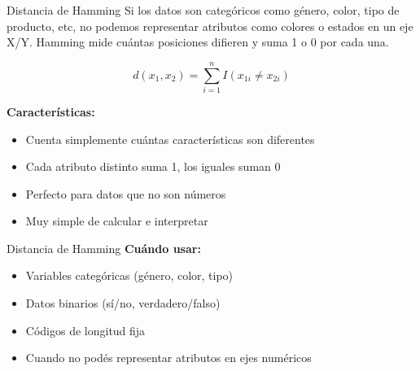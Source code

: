 \documentclass{beamer}
\begin{document}
\begin{frame}{Distancia de Hamming}
    Si los datos son categóricos como género, color, tipo de producto, etc, no podemos representar atributos como colores o estados en un eje X/Y. Hamming mide cuántas posiciones difieren y suma 1 o 0 por cada una.
    
    \[d(x_1, x_2) = \sum_{i=1}^{n} I(x_{1i} \neq x_{2i})\]
    
    \vspace{0.3cm}
    
    \textbf{Características:}
    \begin{itemize}
        \item Cuenta simplemente cuántas características son diferentes
        \item Cada atributo distinto suma 1, los iguales suman 0
        \item Perfecto para datos que no son números
        \item Muy simple de calcular e interpretar
    \end{itemize}
\end{frame}

\begin{frame}{Distancia de Hamming}
    \textbf{Cuándo usar:}
    \begin{itemize}
        \item Variables categóricas (género, color, tipo)
        \item Datos binarios (sí/no, verdadero/falso)
        \item Códigos de longitud fija
        \item Cuando no podés representar atributos en ejes numéricos
    \end{itemize}
\end{frame}
\end{document}
